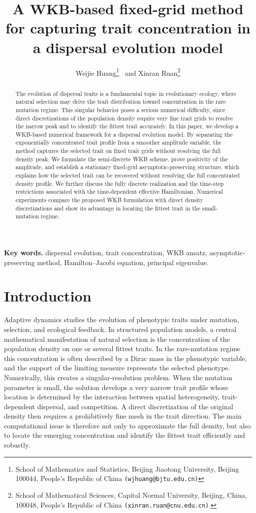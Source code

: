 \documentclass[11pt]{article}
\title{A WKB-based fixed-grid method for capturing trait concentration in a dispersal evolution model}
\author{
Weijie Huang\thanks{School of Mathematics and Statistics, Beijing Jiaotong University, Beijing 100044, People's Republic of China {\tt (wjhuang@bjtu.edu.cn)}} \ and
Xinran Ruan\thanks{School of Mathematical Sciences, Capital Normal University, Beijing, China, 100048, People's Republic of China {\tt (xinran.ruan@cnu.edu.cn)}.}
}
\begin{document}
\date{}
\maketitle

\begin{abstract}
The evolution of dispersal traits is a fundamental topic in evolutionary ecology,
where natural selection may drive the trait distribution toward concentration in
the rare mutation regime. This singular behavior poses a serious numerical
difficulty, since direct discretizations of the population density require very
fine trait grids to resolve the narrow peak and to identify the fittest trait
accurately. In this paper, we develop a WKB-based numerical framework for a
dispersal evolution model. By separating the exponentially concentrated trait
profile from a smoother amplitude variable, the method captures the selected
trait on fixed trait grids without resolving the full density peak. 
We formulate the semi-discrete WKB scheme, prove positivity of the amplitude,
and establish a stationary fixed-grid asymptotic-preserving structure, which explains how the
selected trait can be recovered without resolving the full concentrated density
profile.
We further discuss the fully discrete realization and the time-step restrictions
associated with the time-dependent effective Hamiltonian. Numerical experiments
compare the proposed WKB formulation with direct density discretizations and
show its advantage in locating the fittest trait in the small-mutation regime.
\end{abstract}

{\bf Key words. } dispersal evolution, trait concentration, WKB ansatz, asymptotic-preserving method, Hamilton--Jacobi equation, principal eigenvalue.


\section{Introduction}

{\color{red} Adaptive dynamics studies the evolution of phenotypic traits under mutation, selection, and ecological feedback.  In structured population models, a central mathematical manifestation of natural selection is the concentration of the population density on one or several fittest traits.  In the rare-mutation regime this concentration is often described by a Dirac mass in the phenotypic variable, and the support of the limiting measure represents the selected phenotype.  Numerically, this creates a singular-resolution problem.  When the mutation parameter is small, the solution develops a very narrow trait profile whose location is determined by the interaction between spatial heterogeneity, trait-dependent dispersal, and competition.  A direct discretization of the original density then requires a prohibitively fine mesh in the trait direction.  The main computational issue is therefore not only to approximate the full density, but also to locate the emerging concentration and identify the fittest trait efficiently and robustly.}
\end{document}
